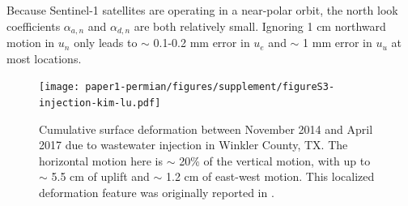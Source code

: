Because Sentinel-1 satellites are operating in a near-polar orbit, the north look coefficients $\alpha_{a,n}$ and $\alpha_{d,n}$ are both relatively small. Ignoring 1 cm northward motion in $u_n$ only leads to $\sim$ 0.1-0.2 mm error in $u_e$ and $\sim$ 1 mm error in $u_u$ at most locations. 



\begin{figure}
	\centering
	\texttt{[image: paper1-permian/figures/supplement/figureS3-injection-kim-lu.pdf]}
	\caption[Vertical and horizontal deformation near Winkler County, TX]{Cumulative surface deformation between November 2014 and April 2017 due to wastewater injection in Winkler County, TX. The horizontal motion here is $\sim$ 20\% of the vertical motion, with up to $\sim$ 5.5 cm of uplift and $\sim$ 1.2 cm of east-west motion. This localized deformation feature was originally reported in \cite{Kim2018AssociationLocalizedGeohazards}.}
	\label{fig:injection-kim-lu}
\end{figure}



%
%
%

